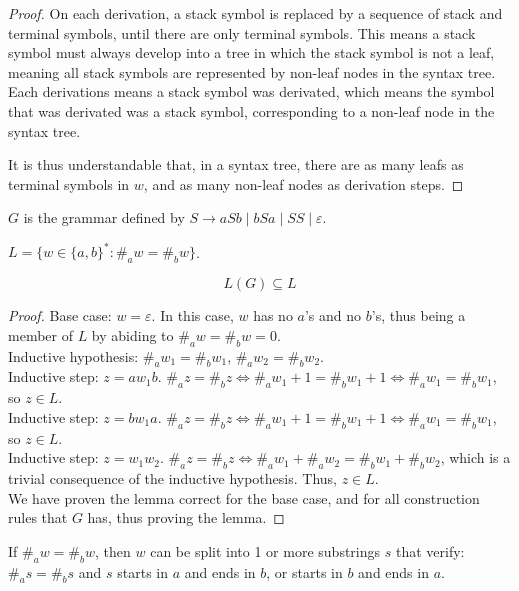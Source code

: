 \documentclass[docid=TP08]{tcom_TP}
\begin{document}
{\begin{proof}
On each derivation, a stack symbol is replaced by a sequence of stack and terminal symbols, until there are only terminal symbols. This means a stack symbol must always develop into a tree in which the stack symbol is not a leaf, meaning all stack symbols are represented by non-leaf nodes in the syntax tree. Each derivations means a stack symbol was derivated, which means the symbol that was derivated was a stack symbol, corresponding to a non-leaf node in the syntax tree.\par
It is thus understandable that, in a syntax tree, there are as many leafs as terminal symbols in $w$, and as many non-leaf nodes as derivation steps.
\end{proof}
\pagebreak
{}
\begin{definition}
$G$ is the grammar defined by $S \rightarrow aSb\mid bSa\mid SS\mid \varepsilon$.
\end{definition}
\begin{definition}
$L=\{w \in \{a,b\}^*\colon \#_aw=\#_bw\}$.
\end{definition}
\begin{lemma} \label{lem:AimpB}
\begin{equation*}
	L(G) \subseteq L
\end{equation*}
\end{lemma}
\begin{proof}
Base case: $w=\varepsilon$. In this case, $w$ has no $a$'s and no $b$'s, thus being a member of $L$ by abiding to $\#_aw=\#_bw=0$.\\
Inductive hypothesis: $\#_aw_1=\#_bw_1$, $\#_aw_2=\#_bw_2$.\\
Inductive step: $z=aw_1b$. $\#_az=\#_bz \iff \#_aw_1+1=\#_bw_1+1 \iff \#_aw_1=\#_bw_1$, so $z \in L$.\\
Inductive step: $z=bw_1a$. $\#_az=\#_bz \iff \#_aw_1+1=\#_bw_1+1 \iff \#_aw_1=\#_bw_1$, so $z \in L$.\\
Inductive step: $z=w_1w_2$. $\#_az=\#_bz \iff \#_aw_1+\#_aw_2=\#_bw_1+\#_bw_2$, which is a trivial consequence of the inductive hypothesis. Thus, $z \in L$.\\
We have proven the lemma correct for the base case, and for all construction rules that $G$ has, thus proving the lemma.
\end{proof}
\begin{lemma} \label{lem:simplemma}
If $\#_aw=\#_bw$, then $w$ can be split into 1 or more substrings $s$ that verify: $\#_as=\#_bs$ and $s$ starts in $a$ and ends in $b$, or starts in $b$ and ends in $a$.

\end{lemma}}
\end{document}
